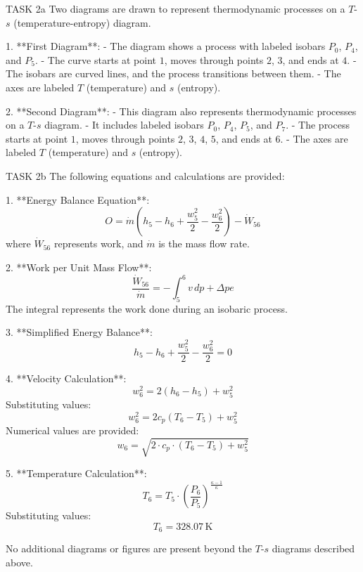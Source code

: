 TASK 2a  
Two diagrams are drawn to represent thermodynamic processes on a \( T \)-\( s \) (temperature-entropy) diagram.  

1. **First Diagram**:  
   - The diagram shows a process with labeled isobars \( P_0 \), \( P_4 \), and \( P_5 \).  
   - The curve starts at point \( 1 \), moves through points \( 2 \), \( 3 \), and ends at \( 4 \).  
   - The isobars are curved lines, and the process transitions between them.  
   - The axes are labeled \( T \) (temperature) and \( s \) (entropy).  

2. **Second Diagram**:  
   - This diagram also represents thermodynamic processes on a \( T \)-\( s \) diagram.  
   - It includes labeled isobars \( P_0 \), \( P_4 \), \( P_5 \), and \( P_7 \).  
   - The process starts at point \( 1 \), moves through points \( 2 \), \( 3 \), \( 4 \), \( 5 \), and ends at \( 6 \).  
   - The axes are labeled \( T \) (temperature) and \( s \) (entropy).  

TASK 2b  
The following equations and calculations are provided:  

1. **Energy Balance Equation**:  
   \[
   O = \dot{m} \left( h_5 - h_6 + \frac{w_5^2}{2} - \frac{w_6^2}{2} \right) - \dot{W}_{56}
   \]  
   where \( \dot{W}_{56} \) represents work, and \( \dot{m} \) is the mass flow rate.  

2. **Work per Unit Mass Flow**:  
   \[
   \frac{\dot{W}_{56}}{\dot{m}} = - \int_5^6 v \, dp + \Delta pe
   \]  
   The integral represents the work done during an isobaric process.  

3. **Simplified Energy Balance**:  
   \[
   h_5 - h_6 + \frac{w_5^2}{2} - \frac{w_6^2}{2} = 0
   \]  

4. **Velocity Calculation**:  
   \[
   w_6^2 = 2 \left( h_6 - h_5 \right) + w_5^2
   \]  
   Substituting values:  
   \[
   w_6^2 = 2 c_p \left( T_6 - T_5 \right) + w_5^2
   \]  
   Numerical values are provided:  
   \[
   w_6 = \sqrt{2 \cdot c_p \cdot (T_6 - T_5) + w_5^2}
   \]  

5. **Temperature Calculation**:  
   \[
   T_6 = T_5 \cdot \left( \frac{P_6}{P_5} \right)^{\frac{\kappa - 1}{\kappa}}
   \]  
   Substituting values:  
   \[
   T_6 = 328.07 \, \text{K}
   \]  

No additional diagrams or figures are present beyond the \( T \)-\( s \) diagrams described above.
